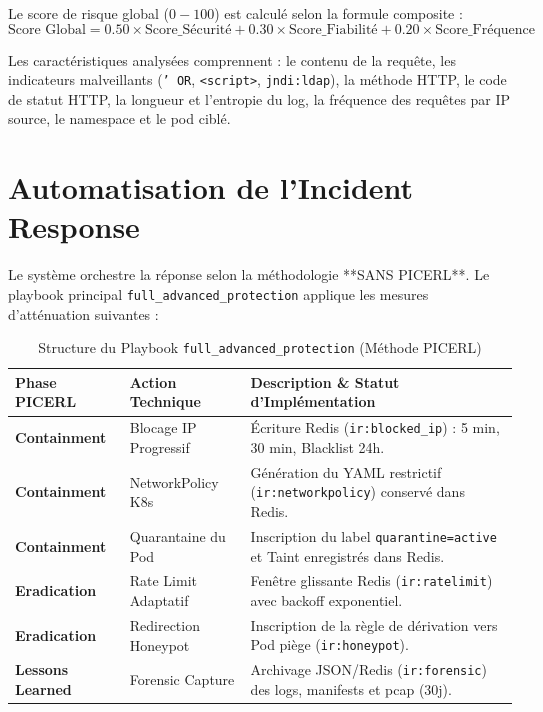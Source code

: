 \documentclass[12pt,a4paper]{report}
\begin{document}
Le score de risque global ($0 - 100$) est calculé selon la formule composite :
\begin{equation}
\text{Score Global} = 0.50 \times \text{Score\_Sécurité} + 0.30 \times \text{Score\_Fiabilité} + 0.20 \times \text{Score\_Fréquence}
\end{equation}

Les caractéristiques analysées comprennent : le contenu de la requête, les indicateurs malveillants (\texttt{' OR}, \texttt{<script>}, \texttt{jndi:ldap}), la méthode HTTP, le code de statut HTTP, la longueur et l'entropie du log, la fréquence des requêtes par IP source, le namespace et le pod ciblé.

\chapter{Automatisation de l'Incident Response}
Le système orchestre la réponse selon la méthodologie **SANS PICERL**. Le playbook principal \texttt{full\_advanced_protection} applique les mesures d'atténuation suivantes :

\begin{table}[H]
\centering
\caption{Structure du Playbook \texttt{full\_advanced\_protection} (Méthode PICERL)}
\label{tab:picerl}
\begin{tabularx}{\textwidth}{llX}
\toprule
\textbf{Phase PICERL} & \textbf{Action Technique} & \textbf{Description \& Statut d'Implémentation} \\
\midrule
\textbf{Containment} & Blocage IP Progressif & Écriture Redis (\texttt{ir:blocked\_ip}) : 5 min, 30 min, Blacklist 24h. \\
\textbf{Containment} & NetworkPolicy K8s & Génération du YAML restrictif (\texttt{ir:networkpolicy}) conservé dans Redis. \\
\textbf{Containment} & Quarantaine du Pod & Inscription du label \texttt{quarantine=active} et Taint enregistrés dans Redis. \\
\textbf{Eradication} & Rate Limit Adaptatif & Fenêtre glissante Redis (\texttt{ir:ratelimit}) avec backoff exponentiel. \\
\textbf{Eradication} & Redirection Honeypot & Inscription de la règle de dérivation vers Pod piège (\texttt{ir:honeypot}). \\
\textbf{Lessons Learned} & Forensic Capture & Archivage JSON/Redis (\texttt{ir:forensic}) des logs, manifests et pcap (30j). \\
\bottomrule
\end{tabularx}
\end{table}
\end{document}
